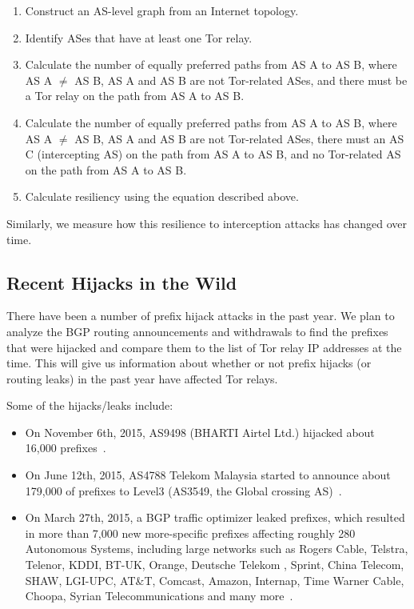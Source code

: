 \begin{enumerate}
\item Construct an AS-level graph from an Internet topology.
\item Identify ASes that have at least one Tor relay.
\item Calculate the number of equally preferred paths from AS A to AS B, where AS A $\neq$ AS B, AS A and AS B are not Tor-related ASes, and there must be a Tor relay on the path from AS A to AS B.
\item Calculate the number of equally preferred paths from AS A to AS B, where AS A $\neq$ AS B, AS A and AS B are not Tor-related ASes, there must an AS C (intercepting AS) on the path from AS A to AS B, and no Tor-related AS on the path from AS A to AS B.
\item Calculate resiliency using the equation described above.
\end{enumerate}

Similarly, we measure how this resilience to interception attacks has changed over time.

\subsection{Recent Hijacks in the Wild}

There have been a number of prefix hijack attacks in the past year.  We plan to analyze the BGP routing announcements and withdrawals to find the prefixes that were hijacked and compare them to the list of Tor relay IP addresses at the time.  This will give us information about whether or not prefix hijacks (or routing leaks) in the past year have affected Tor relays.

Some of the hijacks/leaks include: 

\begin{itemize}
\item On November 6th, 2015, AS9498 (BHARTI Airtel Ltd.) hijacked about 16,000 prefixes~\cite{indiahijack}.
\item On June 12th, 2015, AS4788 Telekom Malaysia started to announce about 179,000 of prefixes to Level3 (AS3549, the Global crossing AS)~\cite{malaysialeak}.
\item On March 27th, 2015, a BGP traffic optimizer leaked prefixes, which resulted in more than 7,000 new more-specific prefixes affecting roughly 280 Autonomous Systems, including large networks such as Rogers Cable, Telstra, Telenor, KDDI, BT-UK, Orange, Deutsche Telekom , Sprint, China Telecom, SHAW, LGI-UPC, AT\&T, Comcast, Amazon, Internap, Time Warner Cable, Choopa, Syrian Telecommunications and many more~\cite{bgpoptimizer}.
\end{itemize}

